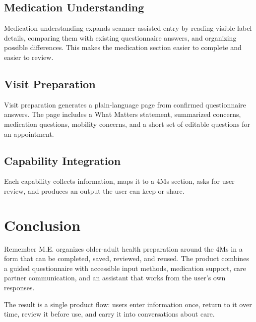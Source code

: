 \documentclass[11pt]{article}
\begin{document}
\subsection{Medication Understanding}

Medication understanding expands scanner-assisted entry by reading visible label details, comparing them with existing questionnaire answers, and organizing possible differences. This makes the medication section easier to complete and easier to review.

\subsection{Visit Preparation}

Visit preparation generates a plain-language page from confirmed questionnaire answers. The page includes a What Matters statement, summarized concerns, medication questions, mobility concerns, and a short set of editable questions for an appointment.

\subsection{Capability Integration}

Each capability collects information, maps it to a 4Ms section, asks for user review, and produces an output the user can keep or share.

\section{Conclusion}

Remember M.E. organizes older-adult health preparation around the 4Ms in a form that can be completed, saved, reviewed, and reused. The product combines a guided questionnaire with accessible input methods, medication support, care partner communication, and an assistant that works from the user's own responses.

The result is a single product flow: users enter information once, return to it over time, review it before use, and carry it into conversations about care.



\end{document}
